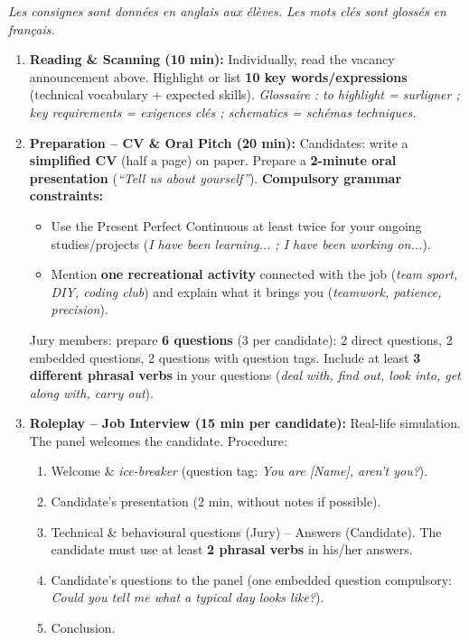 \documentclass[11pt]{article}
\newcommand{\cle}[1]{{\popxbold\color{popdark}#1}}
\newcounter{popsec}
\newcounter{popsub}
\newcommand{\courssub}[1]{%
  \stepcounter{popsub}%
  \par\vspace{9pt}\noindent{\popxbold\fontsize{11.5}{13}\selectfont\color{popink}{\color{poporange}\thepopsec.\thepopsub}\hspace{6pt}#1}\par\nopagebreak\vspace{4pt}
}
\begin{document}
\courssub{Consignes}
\emph{Les consignes sont données en anglais aux élèves. Les mots clés sont glossés en français.}

\begin{enumerate}
    \item \textbf{Reading \& Scanning (10 min):} Individually, read the vacancy announcement above. Highlight or list \textbf{10 key words/expressions} (technical vocabulary + expected skills). \textit{Glossaire : to highlight = surligner ; key requirements = exigences clés ; schematics = schémas techniques.}
    \item \textbf{Preparation -- CV \& Oral Pitch (20 min):} Candidates: write a \textbf{simplified CV} (half a page) on paper. Prepare a \textbf{2-minute oral presentation} (\emph{``Tell us about yourself''}). \textbf{Compulsory grammar constraints:}
    \begin{itemize}
        \item Use the \cle{Present Perfect Continuous} at least twice for your ongoing studies/projects (\emph{I have been learning... ; I have been working on...}).
        \item Mention \textbf{one recreational activity} connected with the job (\emph{team sport, DIY, coding club}) and explain what it brings you (\emph{teamwork, patience, precision}).
    \end{itemize}
    Jury members: prepare \textbf{6 questions} (3 per candidate): 2 direct questions, 2 \cle{embedded questions}, 2 questions with \cle{question tags}. Include at least \textbf{3 different phrasal verbs} in your questions (\emph{deal with, find out, look into, get along with, carry out}).
    \item \textbf{Roleplay -- Job Interview (15 min per candidate):} Real-life simulation. The panel welcomes the candidate. Procedure:
    \begin{enumerate}
        \item Welcome \& \emph{ice-breaker} (question tag: \emph{You are [Name], aren't you?}).
        \item Candidate's presentation (2 min, without notes if possible).
        \item Technical \& behavioural questions (Jury) -- Answers (Candidate). The candidate must use at least \textbf{2 phrasal verbs} in his/her answers.
        \item Candidate's questions to the panel (one embedded question compulsory: \emph{Could you tell me what a typical day looks like?}).
        \item Conclusion.

\end{enumerate}
\end{enumerate}
\end{document}
